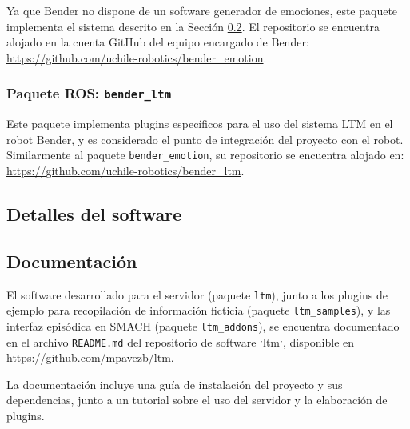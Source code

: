 Ya que Bender no dispone de un software generador de emociones, este paquete implementa el sistema descrito en la Sección \ref{}. El repositorio se encuentra alojado en la cuenta GitHub del equipo encargado de Bender: \url{https://github.com/uchile-robotics/bender\_emotion}.

\subsubsection{Paquete ROS: \texttt{bender\_ltm}}

Este paquete implementa plugins específicos para el uso del sistema LTM en el robot Bender, y es considerado el punto de integración del proyecto con el robot. Similarmente al paquete \texttt{bender\_emotion}, su repositorio se encuentra alojado en: \url{https://github.com/uchile-robotics/bender\_ltm}.




\subsection{Detalles del software}





\subsection{Documentación}

El software desarrollado para el servidor (paquete \texttt{ltm}), junto a los plugins de ejemplo para recopilación de información ficticia (paquete \texttt{ltm\_samples}), y las interfaz episódica en SMACH (paquete \texttt{ltm\_addons}), se encuentra documentado en el archivo \texttt{README.md} del repositorio de software `ltm`, disponible en  \url{https://github.com/mpavezb/ltm}.

La documentación incluye una guía de instalación del proyecto y sus dependencias, junto a un tutorial sobre el uso del servidor y la elaboración de plugins.



